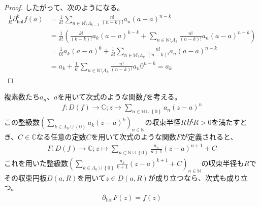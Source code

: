 \documentclass[dvipdfmx]{jsarticle}
\begin{document}
\begin{proof}
したがって、次のようになる。
\begin{align*}
\frac{1}{k!}\partial_{\mathrm{hol}}^{k}f(a) &= \frac{1}{k!}\sum_{n \in \mathbb{N} \setminus \varLambda_{k - 1}} {\frac{n!}{(n - k)!}a_{n}(a - a)^{n - k}}\\
&= \frac{1}{k!}\left( \frac{k!}{(k - k)!}a_{k}(a - a)^{k - k} + \sum_{n \in \mathbb{N} \setminus \varLambda_{k}} {\frac{n!}{(n - k)!}a_{n}(a - a)^{n - k}} \right)\\
&= \frac{1}{0!}a_{k}(a - a)^{0} + \frac{1}{k!}\sum_{n \in \mathbb{N} \setminus \varLambda_{k}} {\frac{n!}{(n - k)!}a_{n}(a - a)^{n - k}}\\
&= a_{k} + \frac{1}{k!}\sum_{n \in \mathbb{N} \setminus \varLambda_{k}} {\frac{n!}{(n - k)!}a_{n}0^{n - k}} = a_{k}
\end{align*}
\end{proof}
\begin{thm}\label{4.2.8.8}
複素数たち$a_{n}$、$a$を用いて次式のような関数$f$を考える。
\begin{align*}
f:D(f) \rightarrow \mathbb{C};z \mapsto \sum_{n \in \mathbb{N} \cup \left\{ 0 \right\}} {a_{n}(z - a)^{n}}
\end{align*}
この整級数$\left( \sum_{k \in \varLambda_{n} \cup \left\{ 0 \right\}} {a_{k}(z - a)^{k}} \right)_{n \in \mathbb{N}}$の収束半径$R$が$R > 0$を満たすとき、$C \in \mathbb{C}$なる任意の定数$C$を用いて次式のような関数$F$が定義されると、
\begin{align*}
F:D(f) \rightarrow \mathbb{C};z \mapsto \sum_{n \in \mathbb{N} \cup \left\{ 0 \right\}} {\frac{a_{n}}{n + 1}(z - a)^{n + 1}} + C
\end{align*}
これを用いた整級数$\left( \sum_{k \in \varLambda_{n} \cup \left\{ 0 \right\}} {\frac{a_{k}}{k + 1}(z - a)^{k + 1}} + C \right)_{n \in \mathbb{N}}$の収束半径も$R$でその収束円板$D(a,R)$を用いて$z \in D(a,R)$が成り立つなら、次式も成り立つ。
\begin{align*}
\partial_{\mathrm{hol}}F(z) = f(z)
\end{align*}
\end{thm}
\end{document}
